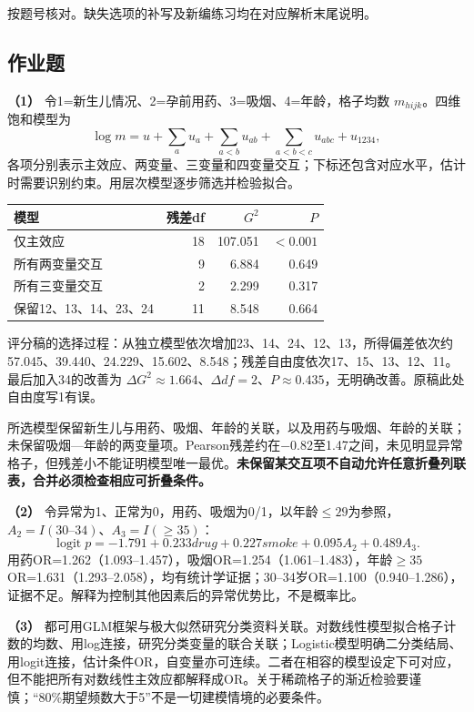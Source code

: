 \begin{keyidea}[核对方式]按题号核对。缺失选项的补写及新编练习均在对应解析末尾说明。\end{keyidea}

\subsection{作业题}


\textbf{（1）} 令1=新生儿情况、2=孕前用药、3=吸烟、4=年龄，格子均数 \(m_{hijk}\)。四维饱和模型为 \[\log m=u+\sum_a u_a+\sum_{a<b}u_{ab}+\sum_{a<b<c}u_{abc}+u_{1234},\] 各项分别表示主效应、两变量、三变量和四变量交互；下标还包含对应水平，估计时需要识别约束。用层次模型逐步筛选并检验拟合。

\begin{longtable}[]{@{}lrrr@{}}
\toprule\noalign{}
模型 & 残差df & \(G^2\) & \(P\) \\
\midrule\noalign{}
\endhead
\bottomrule\noalign{}
\endlastfoot
仅主效应 & 18 & 107.051 & \(<0.001\) \\
所有两变量交互 & 9 & 6.884 & 0.649 \\
所有三变量交互 & 2 & 2.299 & 0.317 \\
保留12、13、14、23、24 & 11 & 8.548 & 0.664 \\
\end{longtable}

评分稿的选择过程：从独立模型依次增加23、14、24、12、13，所得偏差依次约57.045、39.440、24.229、15.602、8.548；残差自由度依次17、15、13、12、11。最后加入34的改善为 \(\Delta G^2\approx1.664\)、\(\Delta df=2\)、\(P\approx0.435\)，无明确改善。原稿此处自由度写1有误。

所选模型保留新生儿与用药、吸烟、年龄的关联，以及用药与吸烟、年龄的关联；未保留吸烟---年龄的两变量项。Pearson残差约在−0.82至1.47之间，未见明显异常格子，但残差小不能证明模型唯一最优。\textbf{未保留某交互项不自动允许任意折叠列联表，合并必须检查相应可折叠条件。}

\textbf{（2）} 令异常为1、正常为0，用药、吸烟为0/1，以年龄\(\le29\)为参照，\(A_2=I(30\text{–}34)\)、\(A_3=I(\ge35)\)： \[\operatorname{logit}p=-1.791+0.233drug+0.227smoke+0.095A_2+0.489A_3.\] 用药OR=1.262（1.093--1.457），吸烟OR=1.254（1.061--1.483），年龄\(\ge35\) OR=1.631（1.293--2.058），均有统计学证据；30--34岁OR=1.100（0.940--1.286），证据不足。解释为控制其他因素后的异常优势比，不是概率比。

\textbf{（3）} 都可用GLM框架与极大似然研究分类资料关联。对数线性模型拟合格子计数的均数、用log连接，研究分类变量的联合关联；Logistic模型明确二分类结局、用logit连接，估计条件OR，自变量亦可连续。二者在相容的模型设定下可对应，但不能把所有对数线性主效应都解释成OR。关于稀疏格子的渐近检验要谨慎；``80\%期望频数大于5''不是一切建模情境的必要条件。


